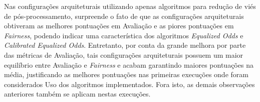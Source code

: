 \documentclass[portugues]{ic-tese}
\begin{document}
Nas configurações arquiteturais utilizando apenas algoritmos para redução de viés de pós-processamento, surpreende o fato de que as configurações arquiteturais obtiveram as melhores pontuações em Avaliação e as piores pontuações em \textit{Fairness}, podendo indicar uma característica dos algoritmos \textit{Equalized Odds} e \textit{Calibrated Equalized Odds}. Entretanto, por conta da grande melhora por parte das métricas de Avaliação, tais configurações arquiteturais possuem um maior equilíbrio entre Avaliação e \textit{Fairness} e acabam garantindo maiores pontuações na média, justificando as melhores pontuações nas primeiras execuções onde foram considerados Uso dos algoritmos implementados. Fora isto, as demais observações anteriores também se aplicam nestas execuções.

\begin{table}[H]
\begin{center}
  \caption{Melhores configurações escolhidas pelo Gerenciador Autonômico \\ Sem uso de algoritmos para redução de viés - 50\% Avaliação/50\% \textit{Fairness}}
\label{tbl:ScoreMAPEKNoproc5050}
\end{center}
\end{table}
\end{document}
